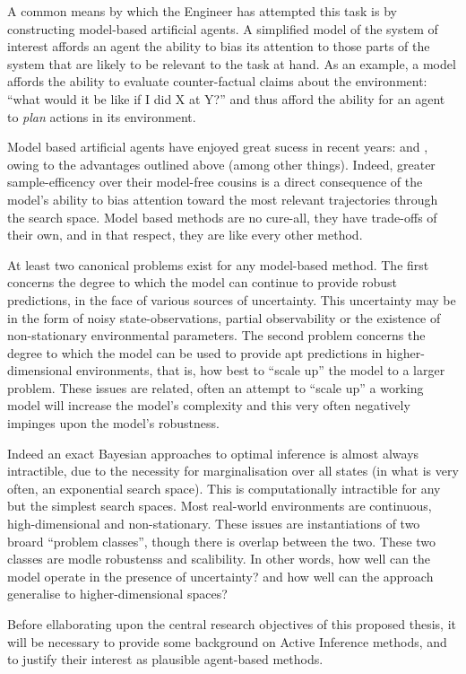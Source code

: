 \documentclass[12pt, twoside]{report}
\begin{document}
A common means by which the Engineer has attempted this task is by constructing model-based artificial agents. A simplified model of the system of interest affords an agent the ability to bias its attention to those parts of the system that are likely to be relevant to the task at hand. As an example, a model affords the ability to evaluate counter-factual claims about the environment: ``what would it be like if I did X at Y?'' and thus afford the ability for an agent to \textit{plan} actions in its environment.      

Model based artificial agents have enjoyed great sucess in recent years: \textcite{Silver2017} and \textcite{dream}, owing to the advantages outlined above (among other things). Indeed, greater sample-efficency over their model-free cousins is a direct consequence of the model's ability to bias attention toward the most relevant trajectories through the search space. Model based methods are no cure-all, they have trade-offs of their own, and in that respect, they are like every other method.

At least two canonical problems exist for any model-based method. The first concerns the degree to which the model can continue to provide robust predictions, in the face of various sources of uncertainty. This uncertainty may be in the form of noisy state-observations, partial observability or the existence of non-stationary environmental parameters. The second problem concerns the degree to which the model can be used to provide apt predictions in higher-dimensional environments, that is, how best to ``scale up'' the model to a larger problem. These issues are related, often an attempt to ``scale up'' a working model will increase the model's complexity and this very often negatively impinges upon the model's robustness.    

Indeed an exact Bayesian approaches to optimal inference is almost always intractible, due to the necessity for marginalisation over all states (in what is very often, an exponential search space). This is computationally intractible for any but the simplest search spaces. Most real-world environments are continuous, high-dimensional and non-stationary. These issues are instantiations of two broard ``problem classes'', though there is overlap between the two. These two classes are modle robustenss and scalibility. In other words, how well can the model operate in the presence of uncertainty? and how well can the approach generalise to higher-dimensional spaces?

Before ellaborating upon the central research objectives of this proposed thesis, it will be necessary to provide some background on Active Inference methods, and to justify their interest as plausible agent-based methods.
\end{document}
